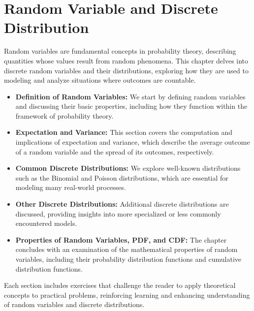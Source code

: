 \chapterspaceabove{6.75cm} 
\chapterspacebelow{7.25cm} 
\chapter{Random Variable and Discrete Distribution}
Random variables are fundamental concepts in probability theory, describing 
quantities whose values result from random phenomena. This chapter delves into 
discrete random variables and their distributions, exploring how they are used to modeling 
and analyze situations where outcomes are countable.

\begin{itemize}
    \item \textbf{Definition of Random Variables:} We start by defining random 
    variables and discussing their basic properties, including how they function 
    within the framework of probability theory.
    
    \item \textbf{Expectation and Variance:} This section covers the computation 
    and implications of expectation and variance, which describe the average 
    outcome of a random variable and the spread of its outcomes, respectively.
    
    \item \textbf{Common Discrete Distributions:} We explore well-known 
    distributions such as the Binomial and Poisson distributions, which are 
    essential for modeling many real-world processes.
    
    \item \textbf{Other Discrete Distributions:} Additional discrete distributions 
    are discussed, providing insights into more specialized or less commonly 
    encountered models.
    
    \item \textbf{Properties of Random Variables, PDF, and CDF:} The chapter 
    concludes with an examination of the mathematical properties of random 
    variables, including their probability distribution functions and cumulative 
    distribution functions.
\end{itemize}

Each section includes exercises that challenge the reader to apply theoretical 
concepts to practical problems, reinforcing learning and enhancing understanding 
of random variables and discrete distributions.

